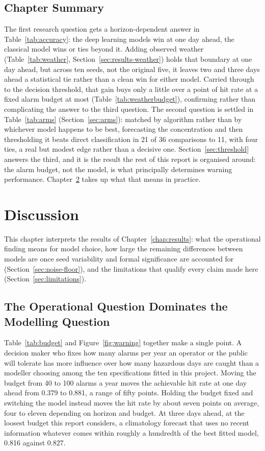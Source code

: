 \documentclass[12pt,a4paper]{report}
\begin{document}
\section{Chapter Summary}

The first research question gets a horizon-dependent answer in Table~\ref{tab:accuracy}: the deep learning models win at one day ahead, the classical model wins or ties beyond it. Adding observed weather (Table~\ref{tab:weather}, Section~\ref{sec:results-weather}) holds that boundary at one day ahead, but across ten seeds, not the original five, it leaves two and three days ahead a statistical tie rather than a clean win for either model. Carried through to the decision threshold, that gain buys only a little over a point of hit rate at a fixed alarm budget at most (Table~\ref{tab:weatherbudget}), confirming rather than complicating the answer to the third question. The second question is settled in Table~\ref{tab:arms} (Section~\ref{sec:arms}): matched by algorithm rather than by whichever model happens to be best, forecasting the concentration and then thresholding it beats direct classification in 21 of 36 comparisons to 11, with four ties, a real but modest edge rather than a decisive one. Section~\ref{sec:threshold} answers the third, and it is the result the rest of this report is organised around: the alarm budget, not the model, is what principally determines warning performance. Chapter~\ref{chap:discussion} takes up what that means in practice.

\chapter{Discussion}
\label{chap:discussion}

This chapter interprets the results of Chapter~\ref{chap:results}: what the
operational finding means for model choice, how large the remaining
differences between models are once seed variability and formal significance
are accounted for (Section~\ref{sec:noise-floor}), and the limitations that
qualify every claim made here (Section~\ref{sec:limitations}).

\section{The Operational Question Dominates the Modelling Question}

Table~\ref{tab:budget} and Figure~\ref{fig:warning} together make a single
point. A decision maker who fixes how many alarms per year an operator or
the public will tolerate has more influence over how many hazardous days are
caught than a modeller choosing among the ten specifications fitted in this
project. Moving the budget from 40 to 100 alarms a year moves the achievable
hit rate at one day ahead from 0.379 to 0.881, a range of fifty points.
Holding the budget fixed and switching the model instead moves the hit rate by
about seven points on average, four to eleven depending on horizon and
budget. At three days ahead, at the loosest budget this report considers, a
climatology forecast that uses no recent information whatever comes within
roughly a hundredth of the best fitted model, 0.816 against 0.827.
\end{document}
